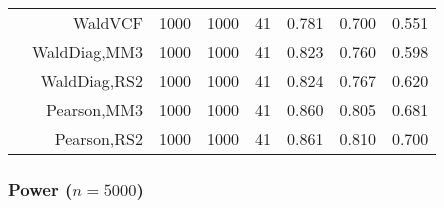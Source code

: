 \documentclass[
]{article}
\begin{document}
\begin{table}[H]
{\begin{tabular}[t]{lrrrrrrr}
\hspace{1em} & WaldVCF & 1000 & 1000 & 41 & 0.781 & 0.700 & 0.551\\

\hspace{1em} & WaldDiag,MM3 & 1000 & 1000 & 41 & 0.823 & 0.760 & 0.598\\

\hspace{1em} & WaldDiag,RS2 & 1000 & 1000 & 41 & 0.824 & 0.767 & 0.620\\

\hspace{1em} & Pearson,MM3 & 1000 & 1000 & 41 & 0.860 & 0.805 & 0.681\\

\hspace{1em} & Pearson,RS2 & 1000 & 1000 & 41 & 0.861 & 0.810 & 0.700\\
\bottomrule
\end{tabular}}
\endgroup{}
\end{table}

\hypertarget{power-n5000}{%
\subsubsection{\texorpdfstring{Power
(\(n=5000\))}{Power (n=5000)}}\label{power-n5000}}
\end{document}
